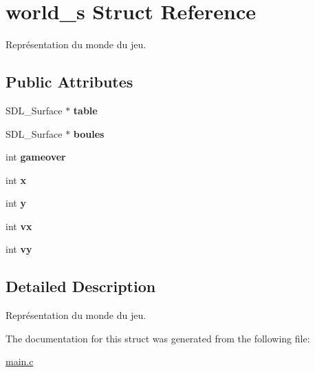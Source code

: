 \hypertarget{structworld__s}{\section{world\-\_\-s Struct Reference}
\label{structworld__s}
}


Représentation du monde du jeu.  


\subsection*{Public Attributes}
\begin{DoxyCompactItemize}
\item 
\hypertarget{structworld__s_aa9646dfaffa5e0b1cbf60d9eae003913}{S\-D\-L\-\_\-\-Surface $\ast$ {\bfseries table}}\label{structworld__s_aa9646dfaffa5e0b1cbf60d9eae003913}

\item 
\hypertarget{structworld__s_add1490be2b8a68c98a84acdfdcc8c09e}{S\-D\-L\-\_\-\-Surface $\ast$ {\bfseries boules}}\label{structworld__s_add1490be2b8a68c98a84acdfdcc8c09e}

\item 
\hypertarget{structworld__s_a693aa82d082fe3467969094559b9bc0f}{int {\bfseries gameover}}\label{structworld__s_a693aa82d082fe3467969094559b9bc0f}

\item 
\hypertarget{structworld__s_a2addf2e779d4aa89b24fb173b1267cc6}{int {\bfseries x}}\label{structworld__s_a2addf2e779d4aa89b24fb173b1267cc6}

\item 
\hypertarget{structworld__s_aa18a353365ed643a950250dba17f5b58}{int {\bfseries y}}\label{structworld__s_aa18a353365ed643a950250dba17f5b58}

\item 
\hypertarget{structworld__s_a169ac15721cf738de50843b3f61895c9}{int {\bfseries vx}}\label{structworld__s_a169ac15721cf738de50843b3f61895c9}

\item 
\hypertarget{structworld__s_acaf4d3c8a81d6aa0f77870c81f972cc6}{int {\bfseries vy}}\label{structworld__s_acaf4d3c8a81d6aa0f77870c81f972cc6}

\end{DoxyCompactItemize}


\subsection{Detailed Description}
Représentation du monde du jeu. 

The documentation for this struct was generated from the following file\-:\begin{DoxyCompactItemize}
\item 
\hyperlink{main_8c}{main.\-c}\end{DoxyCompactItemize}
